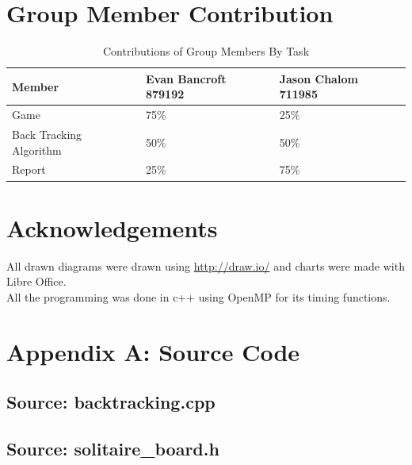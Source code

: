 \documentclass[a4paper]{article}
\begin{document}
\section{Group Member Contribution}
\begin{table}[H]
\centering
\label{contribution}
\begin{tabular}{|l|l|l|}
\hline
\textbf{Member}         & \textbf{Evan Bancroft 879192} & \textbf{Jason Chalom 711985} \\ \hline
Game                    & 75\%                          & 25\%                         \\ \hline
Back Tracking Algorithm & 50\%                          & 50\%                         \\ \hline
Report                  & 25\%                          & 75\%                         \\ \hline
\end{tabular}
\caption{Contributions of Group Members By Task}
\end{table}

\section*{Acknowledgements}
All drawn diagrams were drawn using \url{http://draw.io/} and charts were made with Libre Office.\\ 
All the programming was done in c++ using OpenMP for its timing functions.\\


{}
\break

\section*{Appendix A: Source Code}

\subsection{{Source: backtracking.cpp}}


\subsection{{Source: solitaire_board.h}}

\end{document}
